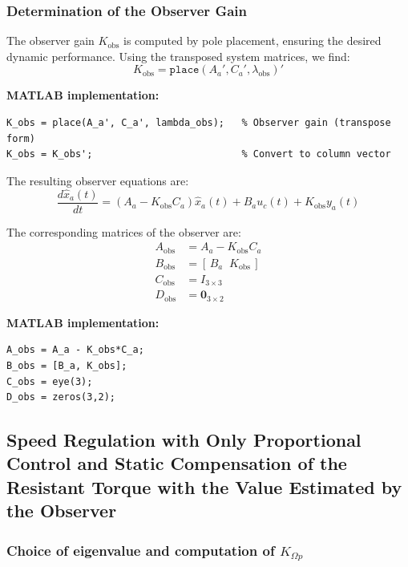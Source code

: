 \documentclass{rapportCS}
\begin{document}
\subsubsection{Determination of the Observer Gain}

The observer gain $K_{\mathrm{obs}}$ is computed by pole placement, ensuring the desired dynamic performance.  
Using the transposed system matrices, we find:
\begin{equation*}
K_{\mathrm{obs}} = \texttt{place}(A_a', C_a', \lambda_{\mathrm{obs}})'
\end{equation*}

\noindent\textbf{MATLAB implementation:}
\begin{verbatim}
K_obs = place(A_a', C_a', lambda_obs);   % Observer gain (transpose form)
K_obs = K_obs';                          % Convert to column vector
\end{verbatim}

The resulting observer equations are:
\begin{equation*}
\frac{d\hat{x}_a(t)}{dt}
= (A_a - K_{\mathrm{obs}} C_a)\hat{x}_a(t)
+ B_a u_c(t)
+ K_{\mathrm{obs}} y_a(t)
\end{equation*}

The corresponding matrices of the observer are:
\begin{align*}
A_{\mathrm{obs}} &= A_a - K_{\mathrm{obs}} C_a \\[4pt]
B_{\mathrm{obs}} &= [\,B_a \;\; K_{\mathrm{obs}}\,] \\[4pt]
C_{\mathrm{obs}} &= I_{3\times3} \\[4pt]
D_{\mathrm{obs}} &= \mathbf{0}_{3\times2}
\end{align*}

\noindent\textbf{MATLAB implementation:}
\begin{verbatim}
A_obs = A_a - K_obs*C_a;
B_obs = [B_a, K_obs];
C_obs = eye(3);
D_obs = zeros(3,2);
\end{verbatim}

\subsection{Speed Regulation with Only Proportional Control and Static Compensation of the Resistant Torque with the Value Estimated by the Observer}

\subsubsection{Choice of eigenvalue and computation of $K_{\Omega p}$}
\end{document}
